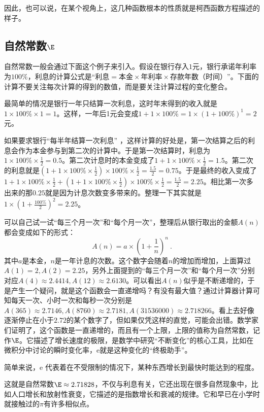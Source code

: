 因此，也可以说，在某个视角上，这几种函数根本的性质就是柯西函数方程描述的样子。

\subsection{自然常数$\E$}

自然常数一般会通过下面这个例子来引入。假设在银行存入$1$元，银行承诺年利率为$100\%$，利息的计算公式是“$\text{利息}=\text{本金}\times\text{年利率}\times\text{存款年数（时间）}$”。下面的计算不要关注每次计算的得到的数值，而是要关注计算过程的变化整合。

最简单的情况是银行一年只结算一次利息，这时年末得到的收入就是$1\times100\%\times1=1$。这样，一年后1元会变成$1+1\times100\%=1\times(1+100\%)^1=2$元。

如果要求银行“每半年结算一次利息” ，这样计算的好处是，第一次结算之后的利息会作为本金参与到第二次的计算中。于是第一次结算时，利息为$\displaystyle1\times100\%\times\frac{1}{2}=0.5$。第二次计息时的本金变成了$\displaystyle1+1\times100\%\times\frac{1}{2}=1.5$。第二次的利息就是$\displaystyle(1+1\times100\%\times\frac{1}{2})\times100\%\times\frac{1}{2}=\frac{1.5}{2}=0.75$。于是最终的收入变成了$\displaystyle1+1\times100\%\times\frac{1}{2}+(1+1\times100\%\times\frac{1}{2})\times100\%\times\frac{1}{2}=\frac{1.5}{2}=2.25$。相比第一次多出来的那$0.25$就是因为计息次数变多带来的。整理一下其实就是$1\times(1+\frac{100\%}{2})^2=2.25$。

可以自己试一试“每三个月一次”和“每个月一次”，整理后从银行取出的金额$A(n)$都会变成如下的形式：
\begin{equation}
A(n)=a\times\left(1+\frac{1}{n}\right)^n~.
\end{equation}
其中$a$是本金，$n$是一年计息的次数。这个数字会随着$n$的增加而增加，上面算过$A(1)=2,A(2)=2.25$，另外上面提到的“每三个月一次”和“每个月一次”分别对应$A(4)\approx 2.4414,A(12)\approx 2.6130$。可以看出$A(n)$似乎是不断递增的，于是产生一个疑问，就是这个函数会一直递增吗？有没有最大值？通过计算器计算可知每天一次、小时一次和每秒一次分别是$A(365)\approx 2.7146,A(8760)\approx2.7181,A(31536000)\approx 2.718266$。看上去好像逐渐停止在小于$2.72$的某个数字了，但如果仅凭这样的直觉，可能会出错。数学家们证明了，这个函数是一直递增的，而且有一个上限，上限的值称为自然常数，记作$\E$。它描述了增长速度的极限，是数学中研究“不断变化”的核心工具，比如在微积分中讨论的瞬时变化率，e就是这种变化的“终极助手”。


简单来说，e 代表着在不受限制的情况下，某种东西增长到最快时能达到的程度。

这就是自然常数$\E \approx 2.71828$，不仅与利息有关，它还出现在很多自然现象中，比如人口增长和放射性衰变，它描述的是指数增长和衰减的规律。它和早已在小学时就接触过的$\pi$有许多相似点。

